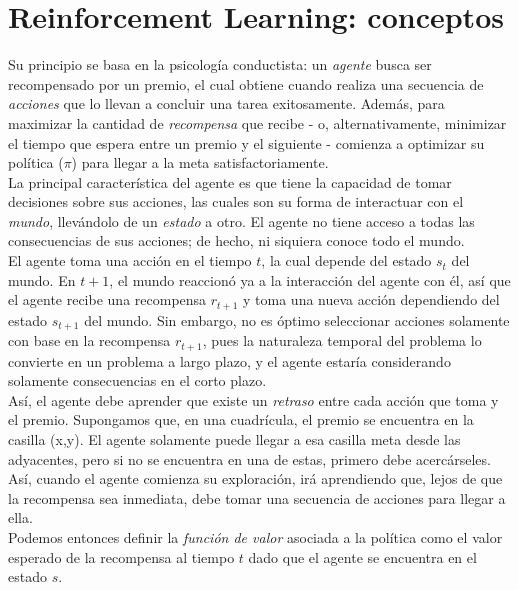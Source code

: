 \section{Reinforcement Learning: conceptos}

Su principio se basa en la psicolog\'ia conductista: un \textit{agente} busca ser recompensado por un premio, el cual obtiene cuando realiza una secuencia de \textit{acciones} que lo llevan a concluir una tarea exitosamente. Adem\'as, para maximizar la cantidad de \textit{recompensa} que recibe - o, alternativamente, minimizar el tiempo que espera entre un premio y el siguiente - comienza a optimizar su pol\'itica (\textit{$\pi$}) para llegar a la meta satisfactoriamente.\\

La principal caracter\'istica del agente es que tiene la capacidad de tomar decisiones sobre sus acciones, las cuales son su forma de interactuar con el \textit{mundo}, llev\'andolo de un \textit{estado} a otro. El agente no tiene acceso a todas las consecuencias de sus acciones; de hecho, ni siquiera conoce todo el mundo.\\

El agente toma una acci\'on en el tiempo $t$, la cual depende del estado $s_t$ del mundo. En $t+1$, el mundo reaccion\'o ya a la interacci\'on del agente con \'el, as\'i que el agente recibe una recompensa $r_{t+1}$ y toma una nueva acci\'on dependiendo del estado $s_{t+1}$ del mundo. Sin embargo, no es \'optimo seleccionar acciones solamente con base en la recompensa $r_{t+1}$, pues la naturaleza temporal del problema lo convierte en un problema a largo plazo, y el agente estar\'ia considerando solamente consecuencias en el corto plazo.\\

As\'i, el agente debe aprender que existe un \textit{retraso} entre cada acci\'on que toma y el premio. Supongamos que, en una cuadr\'icula, el premio se encuentra en la casilla (x,y). El agente solamente puede llegar a esa casilla meta desde las adyacentes, pero si no se encuentra en una de estas, primero debe acerc\'arseles. As\'i, cuando el agente comienza su exploraci\'on, ir\'a aprendiendo que, lejos de que la recompensa sea inmediata, debe tomar una secuencia de acciones para llegar a ella.\\

Podemos entonces definir la \textit{funci\'on de valor} asociada a la pol\'itica como el valor esperado de la recompensa al tiempo $t$ dado que el agente se encuentra en el estado $s$.\\



